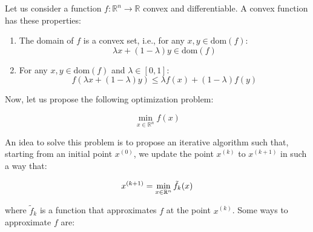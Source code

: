 Let us consider a function $f: \mathbb{R}^n \rightarrow \mathbb{R}$ convex and
differentiable. A convex function has these properties:

\begin{enumerate}
    \item The domain of $f$ is a convex set, i.e., for any $x, y \in \text{dom}(f)$:
    $$\lambda x + (1 - \lambda) y \in \text{dom}(f)$$

    \item For any $x, y \in \text{dom}(f)$ and $\lambda \in [0, 1]$:
    $$f(\lambda x + (1 - \lambda) y) \leq \lambda f(x) + (1 - \lambda) f(y)$$
\end{enumerate}

Now, let us propose the following optimization problem:

\begin{equation}
    \min_{x \in \mathbb{R}^n} f(x)
\end{equation}

An idea to solve this problem is to propose an iterative algorithm such that, starting from
an initial point $x^{(0)}$, we update the point $x^{(k)}$ to $x^{(k+1)}$ in such a way that:

$$x^{(k+1)} = \min_{x \in \mathbb{R}^n} \tilde{f}_k(x)$$
    
where $\tilde{f}_k$ is a function that approximates $f$ at the point $x^{(k)}$. Some ways to
approximate $f$ are:


